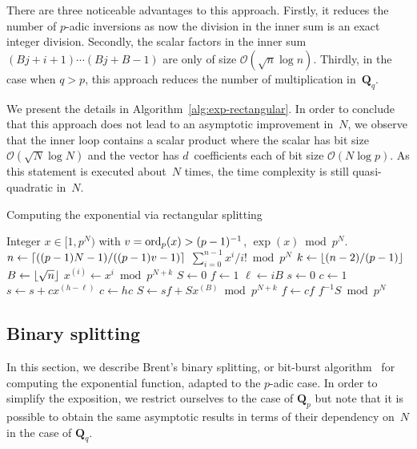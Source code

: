There are three noticeable advantages to this approach.  Firstly, it 
reduces the number of $p$-adic inversions as now the division in the 
inner sum is an exact integer division.  Secondly, the scalar factors 
in the inner sum $(B j + i + 1) \dotsm (B j + B - 1)$ are only of size 
$\mathcal{O}(\sqrt{n} \log n)$.  Thirdly, in the case when $q > p$, 
this approach reduces the number of multiplication in~$\mathbf{Q}_q$.

We present the details in Algorithm~\ref{alg:exp-rectangular}.  In order 
to conclude that this approach does not lead to an asymptotic improvement 
in~$N$, we observe that the inner loop contains a scalar product where the 
scalar has bit size $\mathcal{O}(\sqrt{N} \log N)$ and the 
vector has $d$~coefficients each of bit size $\mathcal{O}(N \log p)$.  
As this statement is executed about~$N$ times, the time complexity is still 
quasi-quadratic in~$N$.

\begin{algorithm}
\caption{Computing the exponential via rectangular splitting}
\label{alg:exp-rectangular}
\begin{algorithmic}
\vspace{1mm}
\Require Integer $x \in [1,p^N)$ with $v = \operatorname{ord}_p(x) > (p-1)^{-1}$,
\Ensure  $\exp(x) \bmod{p^N}$.
\State $n \gets \left\lceil((p-1)N - 1) / ((p-1)v - 1)\right\rceil$
\Return $\sum_{i=0}^{n-1} x^i / i! \bmod{p^N}$
\Else
\State $k \gets \left\lfloor(n-2)/(p-1)\right\rfloor$
\State $B \gets \left\lfloor\sqrt{n}\right\rfloor$
\State $x^{(i)} \gets x^i \bmod {p^{N + k}}$
\EndFor
\State $S \gets 0$
\State $f \gets 1$
\State $\ell \gets i B$
\State $s \gets 0$
\State $c \gets 1$
\State $s \gets s + c x^{(h-\ell)}$
\State $c \gets h c$
\EndIf
\EndFor
\State $S \gets s f + S x^{(B)} \bmod{p^{N + k}}$
\State $f \gets c f$
\EndFor
\Return $f^{-1} S \bmod {p^N}$
\EndIf
\EndProcedure
\end{algorithmic}
\end{algorithm}

\subsection{Binary splitting}

In this section, we describe Brent's binary splitting, or bit-burst 
algorithm~\citep{Brent1976} for computing the exponential function, 
adapted to the $p$-adic case.  In order to simplify the exposition, 
we restrict ourselves to the case of $\mathbf{Q}_p$ but note that 
it is possible to obtain the same asymptotic results in terms of 
their dependency on~$N$ in the case of $\mathbf{Q}_q$.

